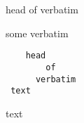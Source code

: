 \begin{myenv}
	head of verbatim
\end{myenv}
some verbatim
\begin{verbatim}
    head
        of
      verbatim
 text
\end{verbatim}
text
